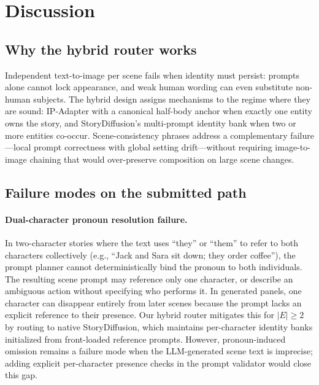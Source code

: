 \section{Discussion}
\label{sec:discussion}

\subsection{Why the hybrid router works}
Independent text-to-image per scene fails when identity must persist: prompts alone cannot lock appearance, and weak human wording can even substitute non-human subjects.
The hybrid design assigns mechanisms to the regime where they are sound: IP-Adapter with a canonical half-body anchor when exactly one entity owns the story, and StoryDiffusion's multi-prompt identity bank when two or more entities co-occur.
Scene-consistency phrases address a complementary failure---local prompt correctness with global setting drift---without requiring image-to-image chaining that would over-preserve composition on large scene changes.

\subsection{Failure modes on the submitted path}

\paragraph{Dual-character pronoun resolution failure.}
In two-character stories where the text uses ``they'' or ``them'' to refer to both characters collectively (e.g., ``Jack and Sara sit down; they order coffee''), the prompt planner cannot deterministically bind the pronoun to both individuals. The resulting scene prompt may reference only one character, or describe an ambiguous action without specifying who performs it. In generated panels, one character can disappear entirely from later scenes because the prompt lacks an explicit reference to their presence. Our hybrid router mitigates this for $|E|\geq 2$ by routing to native StoryDiffusion, which maintains per-character identity banks initialized from front-loaded reference prompts. However, pronoun-induced omission remains a failure mode when the LLM-generated scene text is imprecise; adding explicit per-character presence checks in the prompt validator would close this gap.

